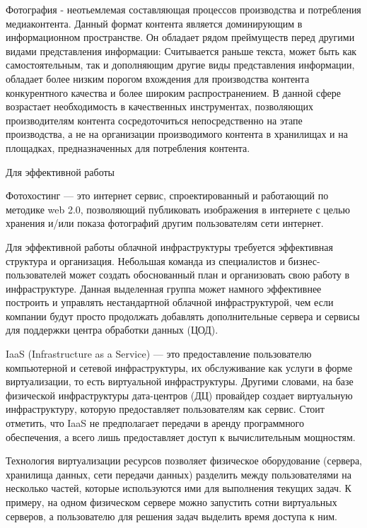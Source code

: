 
Фотография - неотьемлемая составляющая процессов производства и потребления медиаконтента.
Данный формат контента является доминирующим в информационном пространстве. Он обладает рядом преймуществ перед другими видами представления информации: Считывается раньше текста, может быть как самостоятельным, так и дополняющим другие виды представления информации, обладает более низким порогом вхождения для производства контента конкурентного качества и более широким распространением.
В данной сфере возрастает необходимость в качественных инструментах, позволяющих производителям контента сосредоточиться непосредственно на этапе производства, а не на организации производимого контента в хранилищах и на площадках, предназначенных для потребления контента.

Для эффективной работы 

Фотохостинг --- это интернет сервис, спроектированный и работающий по методике web 2.0, позволяющий публиковать изображения в интернете с целью хранения и/или показа фотографий другим пользователям сети интернет.

Для эффективной работы облачной инфраструктуры требуется эффективная структура и организация.
Небольшая команда из специалистов и бизнес-пользователей может создать обоснованный план и организовать свою работу в инфраструктуре.
Данная выделенная группа может намного эффективнее построить и управлять нестандартной облачной инфраструктурой, чем если компании будут просто продолжать добавлять дополнительные сервера и сервисы для поддержки центра обработки данных (ЦОД).

IaaS (Infrastructure as a Service) --- это предоставление пользователю компьютерной и сетевой инфраструктуры, их обслуживание как услуги в форме виртуализации, то есть виртуальной инфраструктуры.
Другими словами, на базе физической инфраструктуры дата-центров (ДЦ) провайдер создает виртуальную инфраструктуру, которую предоставляет пользователям как сервис.
Стоит отметить, что IaaS не предполагает передачи в аренду программного обеспечения, а всего лишь предоставляет доступ к вычислительным мощностям.

Технология виртуализации ресурсов позволяет физическое оборудование (сервера, хранилища данных, сети передачи данных) разделить между пользователями на несколько частей, которые используются ими для выполнения текущих задач.
К примеру, на одном физическом сервере можно запустить сотни виртуальных серверов, а пользователю для решения задач выделить время доступа к ним.

\clearpage
